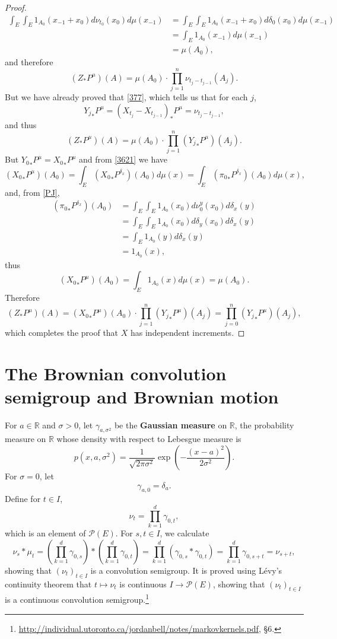 \documentclass{article}
\theoremstyle{definition}
\begin{document}
\begin{proof}
\begin{align*}
\int_E \int_E 1_{A_0}(x_{-1}+x_0) d\nu_{t_0}(x_0) d\mu(x_{-1})&=
\int_E \int_E 1_{A_0}(x_{-1}+x_0) d\delta_0(x_0) d\mu(x_{-1})\\
&=\int_E 1_{A_0}(x_{-1}) d\mu(x_{-1})\\
&=\mu(A_0),
\end{align*}
and therefore
\[
(Z_* P^\mu)(A) = \mu(A_0) \cdot \prod_{j=1}^n \nu_{t_j-t_{j-1}}(A_j).
\]
But we have already proved that \eqref{377}, which tells us that for each $j$,
\[
{Y_j}_*P^\mu = (X_{t_j}-X_{t_{j-1}})_*P^\mu=\nu_{t_j-t_{j-1}},
\]
and thus
\[
(Z_* P^\mu)(A)  = \mu(A_0) \cdot \prod_{j=1}^n ({Y_j}_*P^\mu) (A_j).
\]
But  ${Y_0}_*P^\mu = {X_0}_*P^\mu$ and from \eqref{3621}  we have
\[
({X_0}_*P^\mu)(A_0) = \int_E ({X_0}_*P^{\delta_x})(A_0) d\mu(x) =
\int_E ({\pi_0}_* P^{\delta_x})(A_0) d\mu(x),
\]
and, from \eqref{PJ},
\begin{align*}
({\pi_0}_* P^{\delta_x})(A_0)&=\int_E \int_E 1_{A_0}(x_0) d\nu_0^y(x_0) d\delta_x(y)\\
&=\int_E \int_E 1_{A_0}(x_0) d\delta_y(x_0) d\delta_x(y)\\
&=\int_E 1_{A_0}(y) d\delta_x (y)\\
&=1_{A_0}(x),
\end{align*}
thus
\[
({X_0}_*P^\mu)(A_0)  = \int_E 1_{A_0}(x) d\mu(x) = \mu(A_0).
\]
Therefore
\[
(Z_* P^\mu)(A) 
=({X_0}_*P^\mu)(A_0)  \cdot \prod_{j=1}^n ({Y_j}_*P^\mu) (A_j)
=\prod_{j=0}^n ({Y_j}_*P^\mu) (A_j),
\]
which completes the proof that $X$ has independent increments.
\end{proof}




\section{The Brownian convolution semigroup and Brownian motion}
For $a \in \mathbb{R}$ and $\sigma>0$,
let $\gamma_{a,\sigma^2}$ be the \textbf{Gaussian measure} on $\mathbb{R}$, the probability measure on $\mathbb{R}$
whose density with respect to Lebesgue measure is
\[
p(x,a,\sigma^2) = \frac{1}{\sqrt{2\pi \sigma^2}} \exp\left(-\frac{(x-a)^2}{2\sigma^2}\right).
\]
For $\sigma=0$, let
\[
\gamma_{a,0} = \delta_a.
\]
Define for $t  \in I$,
\[
\nu_t = \prod_{k=1}^d \gamma_{0,t},
\]
which is an element of $\mathscr{P}(E)$. 
For $s,t  \in I$, we calculate
\[
\nu_s * \mu_t =  \left(\prod_{k=1}^d \gamma_{0,s}\right) * \left( \prod_{k=1}^d \gamma_{0,t} \right) 
=\prod_{k=1}^d (\gamma_{0,s} * \gamma_{0,t})
=\prod_{k=1}^d \gamma_{0,s+t}
=\nu_{s+t},
\]
showing that $(\nu_t)_{t \in I}$ is a convolution semigroup.
It is proved using L\'evy's continuity theorem that $t \mapsto \nu_t$ is continuous $I \to \mathscr{P}(E)$, showing that
$(\nu_t)_{t  \in I}$ is a continuous convolution semigroup.\footnote{\url{http://individual.utoronto.ca/jordanbell/notes/markovkernels.pdf}, \S 6.} 
\end{document}
